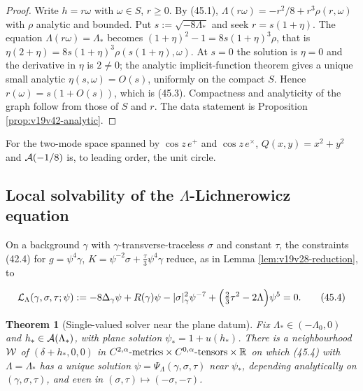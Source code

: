 \documentclass[11pt]{article}
\newtheorem{theorem}{Theorem}[section]
\theoremstyle{remark}
\begin{document}
\begin{proof}
Write \(h=r\omega\) with \(\omega\in S\), \(r\geq0\).  By (45.1),
\(\Lambda(r\omega)=-r^2/8+r^3\rho(r,\omega)\) with \(\rho\) analytic
and bounded.  Put \(s:=\sqrt{-8\Lambda_*}\) and seek \(r=s(1+\eta)\).
The equation \(\Lambda(r\omega)=\Lambda_*\) becomes
\((1+\eta)^2-1=8s(1+\eta)^3\rho\), that is
\(\eta(2+\eta)=8s(1+\eta)^3\rho(s(1+\eta),\omega)\).  At \(s=0\) the
solution is \(\eta=0\) and the derivative in \(\eta\) is \(2\neq0\); the
analytic implicit-function theorem gives a unique small analytic
\(\eta(s,\omega)=O(s)\), uniformly on the compact \(S\).  Hence
\(r(\omega)=s(1+O(s))\), which is (45.3).  Compactness and analyticity of
the graph follow from those of \(S\) and \(r\).  The data statement is
Proposition \ref{prop:v19v42-analytic}.
\end{proof}

For the two-mode space spanned by \(\cos z\,e^+\) and
\(\cos z\,e^\times\), \(Q(x,y)=x^2+y^2\) and \({\cal A}(-1/8)\) is, to
leading order, the unit circle.

\subsection{Local solvability of the \(\Lambda\)-Lichnerowicz equation}

On a background \(\gamma\) with \(\gamma\)-transverse-traceless
\(\sigma\) and constant \(\tau\), the constraints (42.4) for
\(g=\psi^4\gamma\), \(K=\psi^{-2}\sigma+\tfrac\tau3\psi^4\gamma\) reduce,
as in Lemma \ref{lem:v19v28-reduction}, to

\[
 {\cal L}_\Lambda(\gamma,\sigma,\tau;\psi):=
 -8\Delta_\gamma\psi+R(\gamma)\psi-|\sigma|_\gamma^2\psi^{-7}
 +\Bigl(\tfrac23\tau^2-2\Lambda\Bigr)\psi^5=0.                          \tag{45.4}
\]

\begin{theorem}[Single-valued solver near the plane datum]
\label{thm:v19v42-solver}
Fix \(\Lambda_*\in(-\Lambda_0,0)\) and \(h_*\in{\cal A}(\Lambda_*)\),
with plane solution \(\psi_*=1+u(h_*)\).  There is a neighbourhood
\({\cal W}\) of \((\delta+h_*,0,0)\) in
\(C^{2,\alpha}\hbox{-metrics}\times C^{0,\alpha}\hbox{-tensors}\times\mathbb R\)
on which (45.4) with \(\Lambda=\Lambda_*\) has a unique solution
\(\psi=\Psi_\Lambda(\gamma,\sigma,\tau)\) near \(\psi_*\), depending
analytically on \((\gamma,\sigma,\tau)\), and even in
\((\sigma,\tau)\mapsto(-\sigma,-\tau)\).
\end{theorem}
\end{document}
